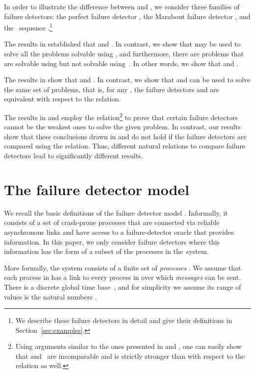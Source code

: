 \documentclass[11pt]{article}
\begin{document}
In order to illustrate the difference between  and ,
     we consider three families of failure detectors: the perfect
     failure detector  \cite{chan:ufdfr}, the Marabout failure
     detector  \cite{guer:01:hfap}, and the~ sequence
     \cite{bhatt:oteow}.\footnote{We describe these failure detectors
     in detail and give their definitions in
     Section~\ref{sec:examples}.} 

The results in \cite{guer:01:hfap} established that  and .
In contrast, we show that  may be used to solve all the problems
     solvable using , and furthermore, there are problems that
     are solvable using  but not solvable using~.
In other words, we show that  and .

The results in \cite{bhatt:oteow} show that 
     and .
In contrast, we show that  and  can be used to
     solve the same set of problems, that is, for any , the failure
     detectors   and  are equivalent with respect
     to the  relation.



The results in \cite{guer:01:hfap} and \cite{bhatt:oteow} employ  the
      relation\footnote{Using arguments similar to the ones
     presented in \cite{guer:01:hfap} and \cite{bhatt:oteow}, one can
     easily show that  and~ are incomparable and 
     is strictly stronger than   with respect to the
      relation as well.} to prove that certain failure detectors
     cannot be the weakest ones to solve the given problem.
In contrast, our results show that these conclusions drawn in
     \cite{guer:01:hfap} and \cite{bhatt:oteow} do not hold if the
     failure detectors are compared using the  relation.
Thus, different natural relations to compare failure detectors lead to
     significantly different results.

\section{The failure detector model}\label{sec:FDmodel}

We recall the basic definitions of the failure detector model
     \cite{chan:ufdfr}.
Informally, it consists of a set of crash-prone processes that are
     connected via reliable asynchronous links and have access to a failure-detector
     oracle that provides information.
In this paper, we only consider failure detectors where this
     information has the form of a subset of the processes in
     the~system.

More formally, the system consists of a finite set of \emph{processes}
     .
We assume that each process  in  has a link  to
     every process  in  over which \emph{messages} can be
     sent.
There is a discrete global time base~, and for simplicity we
     assume its range of values is the natural numbers .
\end{document}
